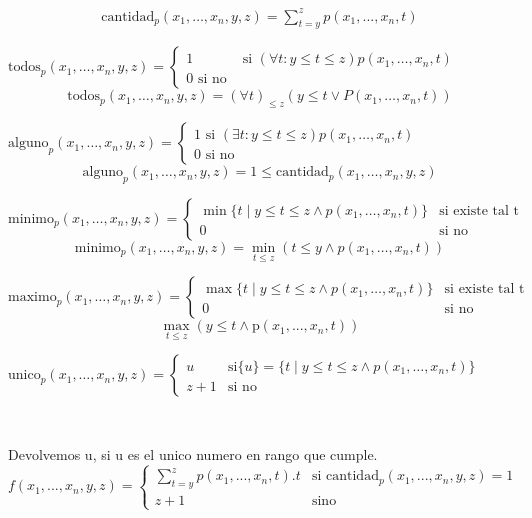 \documentclass{report}
\begin{document}
$$\begin{aligned}
	\text{cantidad}_p(x_1,\ldots,x_n,y,z)=\sum_{t=y}^z p(x_1,...,x_n,t)
\end{aligned}$$

\sol $\mathrm{todos}_{p}(x_{1},\ldots,x_{n},y,z)   =\left\{\begin{array}{ll}1&\text{ si }(\forall t:y\leq t\leq z)p(x_1,\dots,x_n,t)\\0\text{ si no}\end{array}\right. $ 
$$\mathrm{todos}_{p}(x_{1},\ldots,x_{n},y,z)=(\forall t)_{\leq z}(y\leq t\lor P(x_1,\ldots,x_n,t))$$

\sol $\mathrm{alguno}_{p}(x_{1},\ldots,x_{n},y,z) =\left\{\begin{array}{ll}1\text{ si }(\exists t:y\leq t\leq z)p(x_1,\dots,x_n,t)\\0\text{ si no}\end{array}\right. $ 
$$\mathrm{alguno}_{p}(x_{1},\ldots,x_{n},y,z) = 1 \leq \text{cantidad}_p(x_{1},\ldots,x_{n},y,z) $$

\sol $\mathrm{minimo}_{p}(x_{1},\ldots,x_{n},y,z) =\begin{cases}\min\{t\mid y\leq t\leq z\land p(x_1,\dots,x_n,t)\}&\text{si existe tal t}\\0&\text{si no}\end{cases}$
$$\mathrm{minimo}_{p}(x_{1},\ldots,x_{n},y,z)=\min_{t\leqslant z}\left(t\leq y\wedge p(x_1,\ldots,x_n,t)\right)$$

\sol $\mathrm{maximo}_{p}(x_{1},\ldots,x_{n},y,z) =\begin{cases}\max\{t\mid y\leq t\leq z\land p(x_1,\dots,x_n,t)\}&\text{si existe tal t}\\0&\text{si no}\end{cases} $
$$\max_{t\leq z}(y\leq t\wedge\text{p}(x_1,...,x_n,t))$$

\sol $\mathrm{unico}_p(x_1,\ldots,x_n,y,z) =\left\{\begin{array}{ll}u&\text{si} \{u\}=\{t\mid y\le t\le z\wedge p(x_1,\dots,x_n,t)\}\\z+1&\text{si no}\end{array}\right.$ 

~

Devolvemos u, si u es el unico numero en rango que cumple.
$$f(x_1,...,x_n,y,z)=\begin{cases}\sum_{t=y}^{z}p(x_1,...,x_n,t).t&\text{si cantidad}_p(x_1,...,x_n,y,z)=1\\z+1&\text{sino}\end{cases}$$
\end{document}
